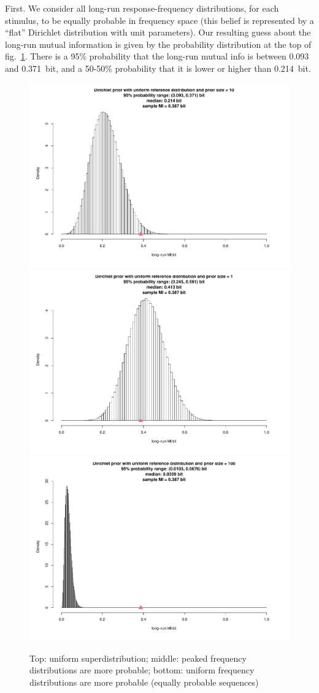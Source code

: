 \documentclass[\ifafour a4paper,12pt,\else a5paper,10pt,\fi%
onecolumn,oneside,article,%
british%
]{memoir}
\theoremstyle{remark}
\theoremstyle{innote}
\renewcommand*{\|}[1][]{\nonscript\,#1\vert\nonscript\;\mathopen{}}
\renewcommand*{\=}{\TextOrMath\texteq\eq}
\newcommand*{\fig}{fig.}%
\begin{document}
First. We consider all long-run response-frequency distributions, for each
stimulus, to be equally probable in frequency space (this belief is
represented by a \enquote{flat} Dirichlet distribution with unit
parameters). Our resulting guess about the long-run mutual information is
given by the probability distribution at the top of
\fig~\ref{fig:example_result}. There is a 95\% probability that the
long-run mutual info is between 0.093 and 0.371~bit, and a 50-50\%
probability that it is lower or higher than 0.214~bit.
\begin{figure}[p]%
\centering\includegraphics[width=0.71\linewidth]{scripts/result_f_dirich10.pdf}\\%
\includegraphics[width=0.71\linewidth]{scripts/result_f_dirich1.pdf}\\%
\includegraphics[width=0.71\linewidth]{scripts/result_f_dirich100.pdf}%
\caption{Top: uniform superdistribution; middle: peaked frequency
  distributions are more probable;
  bottom: uniform frequency distributions are more probable (equally
  probable sequences)}\label{fig:example_result}  
\end{figure}%
\end{document}

